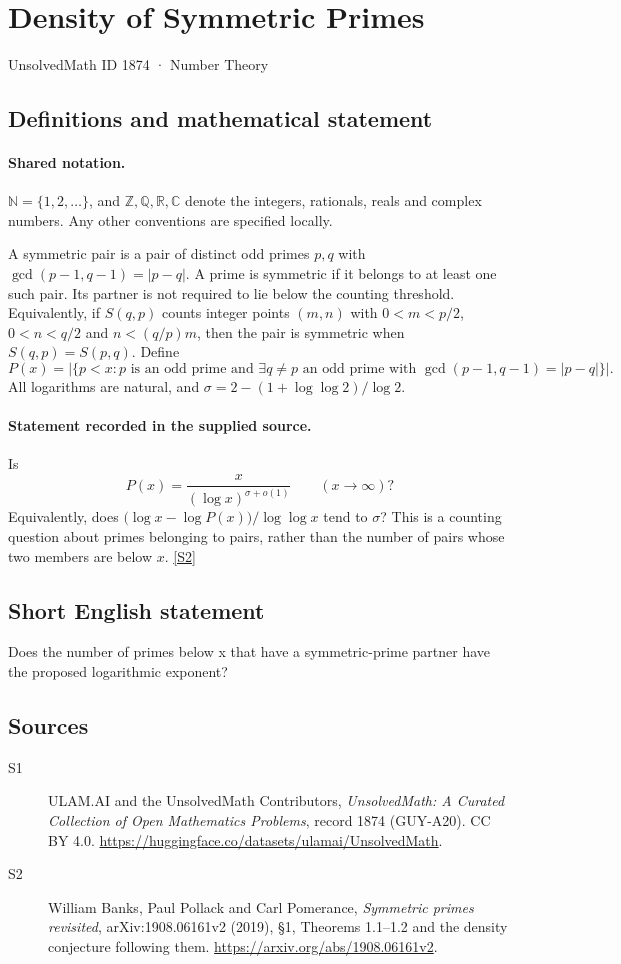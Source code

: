 \documentclass[11pt]{article}
\newcommand{\sref}[2]{\hyperlink{source:#1:#2}{[S#2]}}
\begin{document}
\setcounter{section}{1873}
\section{Density of Symmetric Primes}\label{1874}
{\small\sffamily UnsolvedMath ID 1874 · Number Theory}
\subsection{Definitions and mathematical statement}

\paragraph{Shared notation.}$\mathbb N=\{1,2,\ldots\}$, and $\mathbb Z,\mathbb Q,\mathbb R,\mathbb C$ denote the integers, rationals, reals and complex numbers. Any other conventions are specified locally.


A symmetric pair is a pair of distinct odd primes $p,q$ with $\gcd(p-1,q-1)=|p-q|$. A prime is symmetric if it belongs to at least one such pair. Its partner is not required to lie below the counting threshold. Equivalently, if $S(q,p)$ counts integer points $(m,n)$ with $0<m<p/2$, $0<n<q/2$ and $n<(q/p)m$, then the pair is symmetric when $S(q,p)=S(p,q)$. Define
\[
 P(x)=\bigl|\{p<x:p\text{ is an odd prime and }\exists q\ne p\text{ an odd prime with }\gcd(p-1,q-1)=|p-q|\}\bigr|.
\]
All logarithms are natural, and $\sigma=2-(1+\log\log2)/\log2$.
\paragraph{Statement recorded in the supplied source.}
Is
\[
 P(x)=\frac{x}{(\log x)^{\sigma+o(1)}}\qquad(x\to\infty)?
\]
Equivalently, does $\bigl(\log x-\log P(x)\bigr)/\log\log x$ tend to $\sigma$? This is a counting question about primes belonging to pairs, rather than the number of pairs whose two members are below $x$. \sref{1874}{2}
\subsection{Short English statement}
Does the number of primes below x that have a symmetric-prime partner have the proposed logarithmic exponent?
\subsection{Sources}
\begin{description}
\item[\hypertarget{source:1874:1}{S1}] ULAM.AI and the UnsolvedMath Contributors, \emph{UnsolvedMath: A Curated Collection of Open Mathematics Problems}, record 1874 (GUY-A20). CC BY 4.0. \url{https://huggingface.co/datasets/ulamai/UnsolvedMath}.
\item[\hypertarget{source:1874:2}{S2}] William Banks, Paul Pollack and Carl Pomerance, \emph{Symmetric primes revisited}, arXiv:1908.06161v2 (2019), §1, Theorems 1.1--1.2 and the density conjecture following them. \url{https://arxiv.org/abs/1908.06161v2}.
\end{description}
\label{end:1874}
\end{document}
